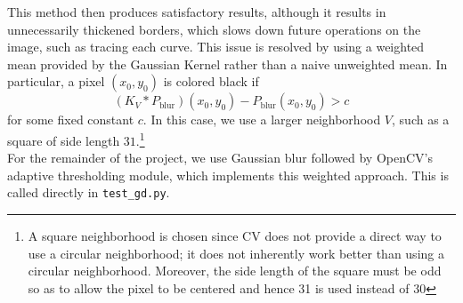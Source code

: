 \documentclass{article}
\begin{document}
This method then produces satisfactory results, although it results in unnecessarily thickened borders, which slows down future operations on the image, such as tracing each curve. This issue is resolved by using a weighted mean provided by
the Gaussian Kernel rather than a naive unweighted mean. In particular, a pixel $(x_0, y_0)$ is colored black if
\[
  (K_V* P_{\text{blur}})(x_0, y_0) - P_{\text{blur}}(x_0, y_0) > c
\]
for some fixed constant $c$. In this case, we use a larger
neighborhood $V$, such as a square of side length $31$.\footnote{A square neighborhood is chosen since CV does not provide a direct way to use a circular neighborhood; it does not inherently work better
than using a circular neighborhood. Moreover, the side length of the square must be odd so as to allow the pixel to be centered and hence 31 is used instead of 30} \\

For the remainder of the project, we use Gaussian blur followed by OpenCV's adaptive thresholding module, which implements this weighted approach. This is called directly in \verb|test_gd.py|. \\
\end{document}
